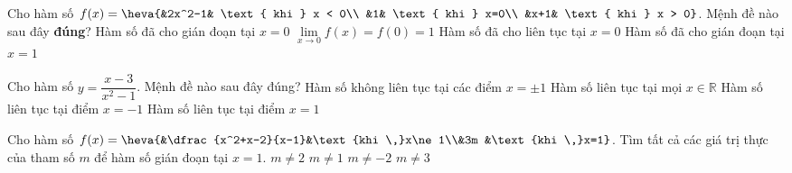\begin{ex}%
	Cho hàm số $f(x)=\heva{&2x^2-1& \text{ khi } x < 0\\ &1& \text{ khi }  x=0\\ &x+1& \text{ khi } x > 0}$. Mệnh đề nào sau đây \textbf{đúng}?
	 \choice
		{\True Hàm số đã cho gián đoạn tại $x=0$} 
		{$\lim\limits_{x  \to 0}f(x)=f(0)=1$}
		 {Hàm số đã cho liên tục tại $x=0$}
		{Hàm số đã cho gián  đoạn tại $x=1$}
\end{ex}

\begin{ex}%
	 Cho hàm số $y=\dfrac{x-3}{x^2-1}$. Mệnh đề nào sau đây đúng?
	\choice 
		{\True Hàm số không liên tục tại các điểm $x=\pm 1$} 
		{Hàm số liên  tục tại mọi $x\in \mathbb{R}$}
		{Hàm số liên tục tại điểm  $x=-1$}
		{Hàm số liên tục  tại điểm $x=1$}
\end{ex}

\begin{ex}%
	Cho hàm số $f(x)=\heva{&\dfrac{x^2+x-2}{x-1}&\text{khi \,}x\ne 1\\&3m &\text{khi \,}x=1}$. Tìm tất cả các giá trị thực của tham số $m$ để hàm  số gián đoạn tại $x=1$.
	\choice 
		{$m\ne 2$} 
		 {\True $m\ne 1$}
		 {$m\ne-2$}
		 {$m\ne 3$}
\end{ex}

